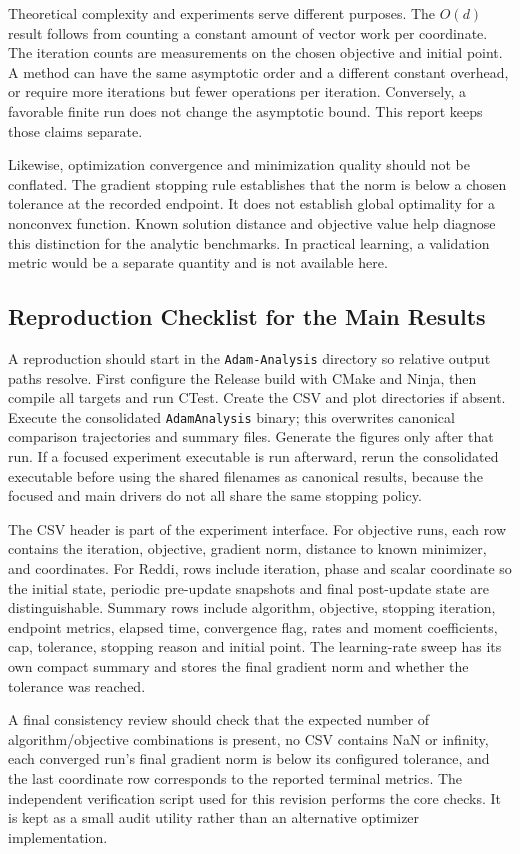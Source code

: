 ﻿\documentclass[conference]{IEEEtran}
\begin{document}
Theoretical complexity and experiments serve different purposes. The $O(d)$ result follows from counting a constant amount of vector work per coordinate. The iteration counts are measurements on the chosen objective and initial point. A method can have the same asymptotic order and a different constant overhead, or require more iterations but fewer operations per iteration. Conversely, a favorable finite run does not change the asymptotic bound. This report keeps those claims separate.

Likewise, optimization convergence and minimization quality should not be conflated. The gradient stopping rule establishes that the norm is below a chosen tolerance at the recorded endpoint. It does not establish global optimality for a nonconvex function. Known solution distance and objective value help diagnose this distinction for the analytic benchmarks. In practical learning, a validation metric would be a separate quantity and is not available here.
\subsection{Reproduction Checklist for the Main Results}
A reproduction should start in the \texttt{Adam-Analysis} directory so relative output paths resolve. First configure the Release build with CMake and Ninja, then compile all targets and run CTest. Create the CSV and plot directories if absent. Execute the consolidated \texttt{AdamAnalysis} binary; this overwrites canonical comparison trajectories and summary files. Generate the figures only after that run. If a focused experiment executable is run afterward, rerun the consolidated executable before using the shared filenames as canonical results, because the focused and main drivers do not all share the same stopping policy.

The CSV header is part of the experiment interface. For objective runs, each row contains the iteration, objective, gradient norm, distance to known minimizer, and coordinates. For Reddi, rows include iteration, phase and scalar coordinate so the initial state, periodic pre-update snapshots and final post-update state are distinguishable. Summary rows include algorithm, objective, stopping iteration, endpoint metrics, elapsed time, convergence flag, rates and moment coefficients, cap, tolerance, stopping reason and initial point. The learning-rate sweep has its own compact summary and stores the final gradient norm and whether the tolerance was reached.

A final consistency review should check that the expected number of algorithm/objective combinations is present, no CSV contains NaN or infinity, each converged run's final gradient norm is below its configured tolerance, and the last coordinate row corresponds to the reported terminal metrics. The independent verification script used for this revision performs the core checks. It is kept as a small audit utility rather than an alternative optimizer implementation.
\end{document}
